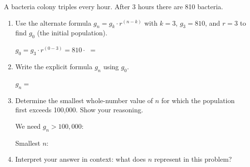 \documentclass[10pt]{article}
\begin{document}
\vspace{0.08in}

\begin{tcolorbox}[colback=white, colframe=black!40,
    title=\textbf{Tier E --- Extend},
    fonttitle=\bfseries, arc=2mm, left=3mm, right=3mm, top=2mm, bottom=2mm]

A bacteria colony triples every hour. After 3 hours there are 810 bacteria.

\begin{enumerate}[itemsep=12pt]

  \item Use the alternate formula $g_n = g_k \cdot r^{(n-k)}$ with $k = 3$, $g_3 = 810$,
        and $r = 3$ to find $g_0$ (the initial population).

        \vspace{0.04in}
        $g_0 = g_3 \cdot r^{(0-3)} = 810 \cdot $  $=$ 

  \item Write the explicit formula $g_n$ using $g_0$.

        \vspace{0.04in}
        $g_n = $ 

  \item Determine the smallest whole-number value of $n$ for which the population first
        exceeds 100{,}000. Show your reasoning.

        \vspace{0.04in}
        We need $g_n > 100{,}000$: 

        \vspace{0.04in}
        Smallest $n$: 

  \item Interpret your answer in context: what does $n$ represent in this problem?

        \vspace{0.04in}

\end{enumerate}
\end{tcolorbox}
\end{document}
